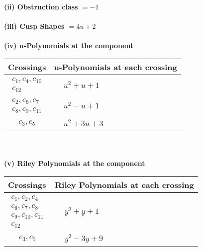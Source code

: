 \documentclass[1p]{elsarticle_modified}
\theoremstyle{definition}
\begin{document}
\flushleft \textbf{(ii) Obstruction class $= -1$}\\~\\
\flushleft \textbf{(iii) Cusp Shapes $= 4 u+2$}\\~\\
\newpage\renewcommand{\arraystretch}{1}
\flushleft \textbf{(iv) u-Polynomials at the component}\newline \\
\begin{tabular}{m{50pt}|m{274pt}}
Crossings & \hspace{64pt}u-Polynomials at each crossing \\
\hline $$\begin{aligned}c_{1},c_{4},c_{10}\\c_{12}\end{aligned}$$&$\begin{aligned}
&u^2+u+1
\end{aligned}$\\
\hline $$\begin{aligned}c_{2},c_{6},c_{7}\\c_{8},c_{9},c_{11}\end{aligned}$$&$\begin{aligned}
&u^2- u+1
\end{aligned}$\\
\hline $$\begin{aligned}c_{3},c_{5}\end{aligned}$$&$\begin{aligned}
&u^2+3 u+3
\end{aligned}$\\
\hline
\end{tabular}\\~\\
\newpage\renewcommand{\arraystretch}{1}
\flushleft \textbf{(v) Riley Polynomials at the component}\newline \\
\begin{tabular}{m{50pt}|m{274pt}}
Crossings & \hspace{64pt}Riley Polynomials at each crossing \\
\hline $$\begin{aligned}c_{1},c_{2},c_{4}\\c_{6},c_{7},c_{8}\\c_{9},c_{10},c_{11}\\c_{12}\end{aligned}$$&$\begin{aligned}
&y^2+y+1
\end{aligned}$\\
\hline $$\begin{aligned}c_{3},c_{5}\end{aligned}$$&$\begin{aligned}
&y^2-3 y+9
\end{aligned}$\\
\hline
\end{tabular}\\~\\
\end{document}
